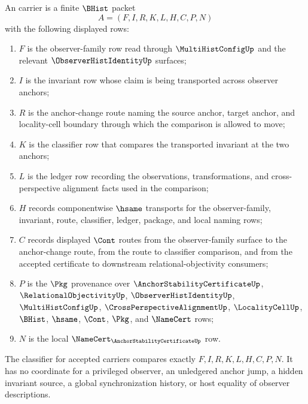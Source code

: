 \begin{definition}
\label{def:anchor-stability-certificate-carrier}
An \AnchorStabilityCertificateUp{} carrier is a finite $\BHist$ packet
$$
A=(F,I,R,K,L,H,C,P,N)
$$
with the following displayed rows:
\begin{enumerate}
\item $F$ is the observer-family row read through $\MultiHistConfigUp$ and the relevant $\ObserverHistIdentityUp$ surfaces;
\item $I$ is the invariant row whose claim is being transported across observer anchors;
\item $R$ is the anchor-change route naming the source anchor, target anchor, and locality-cell boundary through which the comparison is allowed to move;
\item $K$ is the classifier row that compares the transported invariant at the two anchors;
\item $L$ is the ledger row recording the observations, transformations, and cross-perspective alignment facts used in the comparison;
\item $H$ records componentwise $\hsame$ transports for the observer-family, invariant, route, classifier, ledger, package, and local naming rows;
\item $C$ records displayed $\Cont$ routes from the observer-family surface to the anchor-change route, from the route to classifier comparison, and from the accepted certificate to downstream relational-objectivity consumers;
\item $P$ is the $\Pkg$ provenance over $\AnchorStabilityCertificateUp$, $\RelationalObjectivityUp$, $\ObserverHistIdentityUp$, $\MultiHistConfigUp$, $\CrossPerspectiveAlignmentUp$, $\LocalityCellUp$, $\BHist$, $\hsame$, $\Cont$, $\Pkg$, and $\NameCert$ rows;
\item $N$ is the local $\NameCert_{\AnchorStabilityCertificateUp}$ row.
\end{enumerate}
The classifier for accepted carriers compares exactly $F,I,R,K,L,H,C,P,N$. It has no coordinate for a privileged observer, an unledgered anchor jump, a hidden invariant source, a global synchronization history, or host equality of observer descriptions.
\end{definition}

